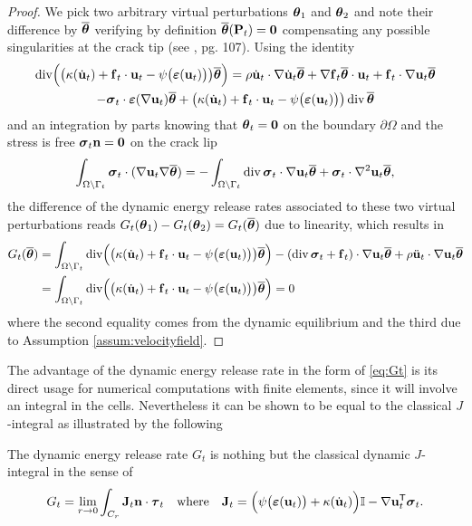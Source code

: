 \begin{proof}
We pick two arbitrary virtual perturbations $\vtheta_1$ and $\vtheta_2$ and note their difference by $\overline{\vtheta}$ verifying by definition $\ovtheta(\vec{P}_t)=\vec{0}$ compensating any possible singularities at the crack tip (see \cite{BonnetFrangi:2006}, pg. 107). Using the identity
\begin{multline} \label{eq:div}
\div\Bigl(\bigl(\kappa(\dot{\vec{u}}_t)+\vec{f}_t\cdot\vec{u}_t-\psi\bigl(\eps(\vec{u}_t)\bigr)\bigr)\ovtheta\Bigr)=\rho\dot{\vec{u}}_t\cdot\nabla\dot{\vec{u}}_t\ovtheta+\nabla\vec{f}_t\ovtheta\cdot\vec{u}_t+\vec{f}_t\cdot\nabla\vec{u}_t\ovtheta \\
-\sig_t\cdot\eps(\nabla\vec{u}_t)\ovtheta+\bigl(\kappa(\dot{\vec{u}}_t)+\vec{f}_t\cdot\vec{u}_t-\psi\bigl(\eps(\vec{u}_t)\bigr)\bigr)\div\ovtheta
\end{multline}
and an integration by parts knowing that $\vtheta_t=\vec{0}$ on the boundary $\partial\Omega$ and the stress is free $\sig_t\vec{n}=\vec{0}$ on the crack lip
\[
\int_\domaint\sig_t\cdot(\nabla\vec{u}_t\nabla\ovtheta)=-\int_\domaint\div\sig_t\cdot\nabla\vec{u}_t\ovtheta+\sig_t\cdot\nabla^2\vec{u}_t\ovtheta,
\]
the difference of the dynamic energy release rates associated to these two virtual perturbations reads $G_t(\vtheta_1)-G_t(\vtheta_2)=G_t(\ovtheta)$ due to linearity, which results in
\begin{align*}
G_t(\ovtheta) &= \int_\domaint\div\Bigl(\bigl(\kappa(\dot{\vec{u}}_t)+\vec{f}_t\cdot\vec{u}_t-\psi\bigl(\eps(\vec{u}_t)\bigr)\bigr)\ovtheta\Bigr)-(\div\sig_t+\vec{f}_t)\cdot\nabla\vec{u}_t\ovtheta+\rho\ddot{\vec{u}}_t\cdot\nabla\vec{u}_t\ovtheta \\
&= \int_\domaint\div\Bigl(\bigl(\kappa(\dot{\vec{u}}_t)+\vec{f}_t\cdot\vec{u}_t-\psi\bigl(\eps(\vec{u}_t)\bigr)\bigr)\ovtheta\Bigr)=0
\end{align*}
where the second equality comes from the dynamic equilibrium and the third due to Assumption \ref{assum:velocityfield}.
\end{proof}

The advantage of the dynamic energy release rate in the form of \eqref{eq:Gt} is its direct usage for numerical computations with finite elements, since it will involve an integral in the cells. Nevertheless it can be shown to be equal to the classical $J$-integral as illustrated by the following
\begin{proposition} \label{prop:J}
The dynamic energy release rate $G_t$ is nothing but the classical dynamic $J$-integral in the sense of \cite{NakamuraShihFreund:1985,Cherepanov:1989}
\begin{equation} \label{eq:Jdyn}
G_t=\lim_{r\to 0}\int_{C_r}\vec{J}_t\vec{n}\cdot\vtau_t\quad\text{where}\quad\vec{J}_t=\Bigl(\psi\bigl(\eps(\vec{u}_t)\bigr)+\kappa(\dot{\vec{u}}_t)\Bigr)\mathbb{I}-\nabla\vec{u}_t^\mT\sig_t.
\end{equation}
\end{proposition}

